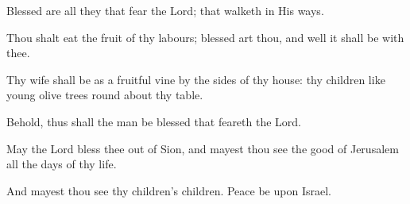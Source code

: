 Blessed are all they that fear the Lord; that walketh in His ways.

Thou shalt eat the fruit of thy labours; blessed art thou, and well it shall be with thee.

Thy wife shall be as a fruitful vine by the sides of thy house: thy children like young olive trees round about thy table.

Behold, thus shall the man be blessed that feareth the Lord.

May the Lord bless thee out of Sion, and mayest thou see the good of Jerusalem all the days of thy life.

And mayest thou see thy children's children. Peace be upon Israel.
